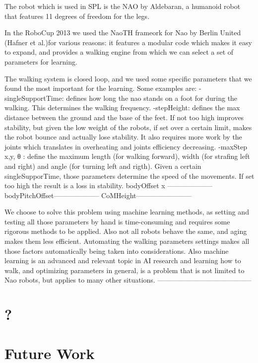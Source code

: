 \documentclass[a4paper, twocolumn]{article}
\begin{document}
The robot which is used in SPL is the NAO by Aldebaran, a humanoid robot that features 11 degrees of freedom for the legs.

In the RoboCup 2013 we used the NaoTH frameork for Nao by Berlin United (Hafner et al.)for various reasons: it features a modular code which makes it easy to expand, and provides a walking engine from which we can select a set of parameters for learning. 

The walking system is closed loop, and we used some specific parameters that we found the most important for the learning.
Some examples are:
-singleSupportTime: defines how long the nao stands on a foot for during the walking. This determines the walking frequency.
-stepHeight: defines the max distance between the ground and the base of the feet. If not too high improves stability, but given the low weight of the robots, if set over a certain limit, makes the robot bounce and actually lose stability. It also requires more work by the joints which translates in overheating and joints efficiency decreasing. 
-maxStep x,y, θ : define the maximum length (for walking forward), width (for strafing left and right) and angle (for turning left and rigth). Given a certain singleSupporTime, those parameters determine the speed of the movements. If set too high the result is a loss in stability.
bodyOffset x --------------------
bodyPitchOffset--------------------
CoMHeight------------------------

We choose to solve this problem using machine learning methods, as setting and testing all those parameters by hand is time-consuming and requires some rigorous methods to be applied. Also not all robots behave the same, and aging makes them less efficient. Automating the walking parameters settings makes all those factors automatically being taken into considerations. Also machine learning is an advanced and relevant topic in AI research and learning how to walk, and optimizing parameters in general, is a problem that is not limited to Nao robots, but applies to many other situations. -----------------------------------------


\section{?}



\section{Future Work}
 
\end{document}
